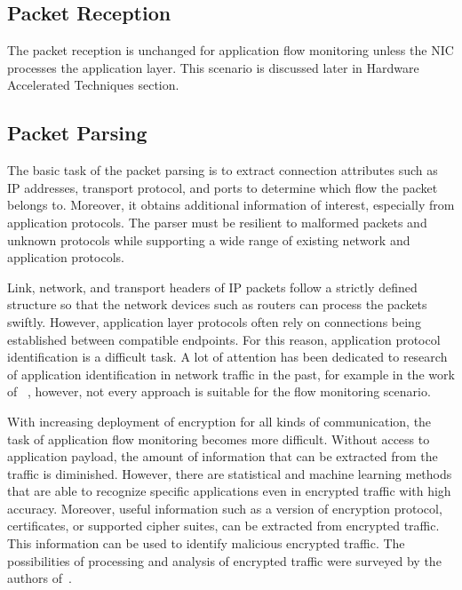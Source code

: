 \subsection{Packet Reception}

The packet reception is unchanged for application flow monitoring unless the NIC processes the application layer. This scenario is discussed later in Hardware Accelerated Techniques section.


\subsection{Packet Parsing}

The basic task of the packet parsing is to extract connection attributes such as IP addresses, transport protocol, and ports to determine which flow the packet belongs to. Moreover, it obtains additional information of interest, especially from application protocols. The parser must be resilient to malformed packets and unknown protocols while supporting a wide range of existing network and application protocols.

Link, network, and transport headers of IP packets follow a strictly defined structure so that the network devices such as routers can process the packets swiftly. However, application layer protocols often rely on connections being established between compatible endpoints. For this reason, application protocol identification is a difficult task. A lot of attention has been dedicated to research of application identification in network traffic in the past, for example in the work of \citeauthor{Bujlow-2015-classification}~\cite{Bujlow-2015-classification}, however, not every approach is suitable for the flow monitoring scenario.

With increasing deployment of encryption for all kinds of communication, the task of application flow monitoring becomes more difficult. Without access to application payload, the amount of information that can be extracted from the traffic is diminished. However, there are statistical and machine learning methods that are able to recognize specific applications even in encrypted traffic with high accuracy. Moreover, useful information such as a version of encryption protocol, certificates, or supported cipher suites, can be extracted from encrypted traffic. This information can be used to identify malicious encrypted traffic. The possibilities of processing and analysis of encrypted traffic were surveyed by the authors of~\cite{Velan-2015-Survey}.

